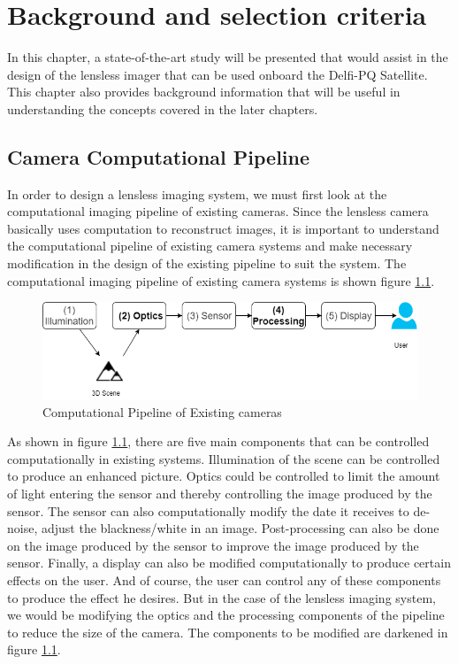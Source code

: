 \chapter{Background and selection criteria}
\label{chp:LitSurvey}
In this chapter, a state-of-the-art study will be presented that would assist in the design of the lensless imager that can be used onboard the Delfi-PQ Satellite. This chapter also provides background information that will be useful in understanding the concepts covered in the later chapters. 
\section{Camera Computational Pipeline}
In order to design a lensless imaging system, we must first look at the computational imaging pipeline of existing cameras. Since the lensless camera basically uses computation to reconstruct images, it is important to understand the computational pipeline of existing camera systems and make necessary modification in the design of the existing pipeline to suit the system. The computational imaging pipeline of existing camera systems is shown figure \ref{fig:CompPipeline}\cite{CompPipeline}.
\begin{figure}[htb]
\includegraphics[width=\textwidth]{pics/CompPipeline}
\caption{Computational Pipeline of Existing cameras}
\label{fig:CompPipeline}
\end{figure}
As shown in figure \ref{fig:CompPipeline}, there are five main components that can be controlled computationally in existing systems. Illumination of the scene can be controlled to produce an enhanced picture. Optics could be controlled to limit the amount of light entering the sensor and thereby controlling the image produced by the sensor. The sensor can also computationally modify the date it receives to de-noise, adjust the blackness/white in an image. Post-processing can also be done on the image produced by the sensor to improve the image produced by the sensor. Finally, a display can also be modified computationally to produce certain effects on the user. And of course, the user can control any of these components to produce the effect he desires. But in the case of the lensless imaging system, we would be modifying the optics and the processing components of the pipeline to reduce the size of the camera. The components to be modified are darkened in figure \ref{fig:CompPipeline}. 

